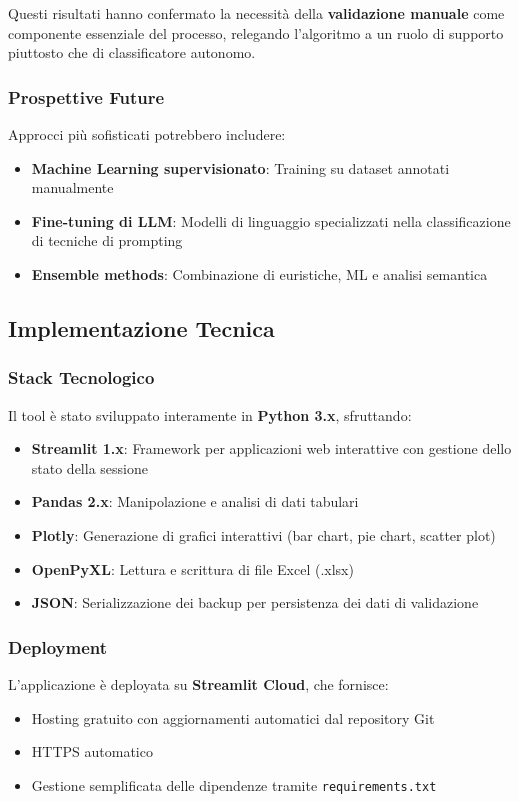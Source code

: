 \documentclass[a4paper,12pt]{article}
\begin{document}
Questi risultati hanno confermato la necessità della \textbf{validazione manuale} come componente essenziale del processo, relegando l'algoritmo a un ruolo di supporto piuttosto che di classificatore autonomo.

\subsubsection{Prospettive Future}
Approcci più sofisticati potrebbero includere:
\begin{itemize}
    \item \textbf{Machine Learning supervisionato}: Training su dataset annotati manualmente
    \item \textbf{Fine-tuning di LLM}: Modelli di linguaggio specializzati nella classificazione di tecniche di prompting
    \item \textbf{Ensemble methods}: Combinazione di euristiche, ML e analisi semantica
\end{itemize}

\subsection{Implementazione Tecnica}

\subsubsection{Stack Tecnologico}
Il tool è stato sviluppato interamente in \textbf{Python 3.x}, sfruttando:

\begin{itemize}
    \item \textbf{Streamlit 1.x}: Framework per applicazioni web interattive con gestione dello stato della sessione
    \item \textbf{Pandas 2.x}: Manipolazione e analisi di dati tabulari
    \item \textbf{Plotly}: Generazione di grafici interattivi (bar chart, pie chart, scatter plot)
    \item \textbf{OpenPyXL}: Lettura e scrittura di file Excel (.xlsx)
    \item \textbf{JSON}: Serializzazione dei backup per persistenza dei dati di validazione
\end{itemize}

\subsubsection{Deployment}
L'applicazione è deployata su \textbf{Streamlit Cloud}, che fornisce:
\begin{itemize}
    \item Hosting gratuito con aggiornamenti automatici dal repository Git
    \item HTTPS automatico
    \item Gestione semplificata delle dipendenze tramite \texttt{requirements.txt}
\end{itemize}
\end{document}
